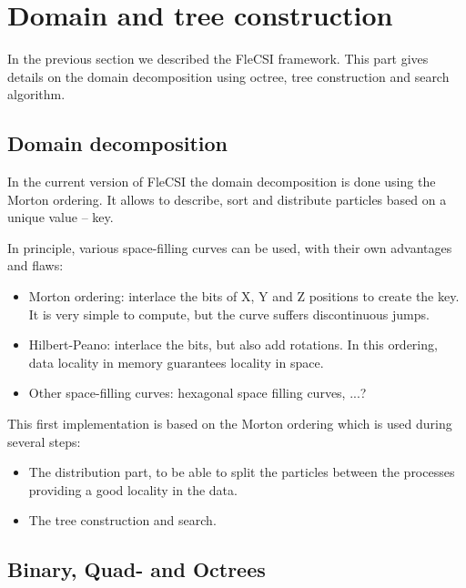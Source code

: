 \documentclass[notes.tex]{subfiles}
\begin{document}
\section{Domain and tree construction}
In the previous section we described the FleCSI framework.
This part gives details on the domain decomposition using octree, tree 
construction and search algorithm.

\subsection{Domain decomposition}
In the current version of FleCSI the domain decomposition is done using the
Morton ordering.
It allows to describe, sort and distribute particles based on a unique value
-- key.

In principle, various space-filling curves can be used, with their own
advantages and flaws:
\begin{itemize}
\item Morton ordering: interlace the bits of X, Y and Z positions to create
the key. It is very simple to compute, but the curve suffers discontinuous
jumps.
\item Hilbert-Peano: interlace the bits, but also add rotations. In this
ordering, data locality in memory guarantees locality in space.
\item Other space-filling curves: hexagonal space filling curves, ...?
\end{itemize}

This first implementation is based on the Morton ordering which is used during
several steps:
\begin{itemize}
\item The distribution part, to be able to split the particles between the
processes providing a good locality in the data.
\item The tree construction and search. 
\end{itemize}

\subsection{Binary, Quad- and Octrees}
\end{document}

